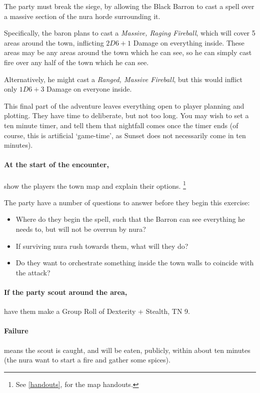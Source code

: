 \begin{multicols}{2}

\noindent
The party must break the siege, by allowing the Black Barron to cast a spell over a massive section of the nura horde surrounding it.

Specifically, the baron plans to cast a \textit{Massive, Raging Fireball}, which will cover 5 areas around the town, inflicting $2D6+1$ Damage on everything inside.
These areas may be any areas around the town which he can see, so he can simply cast fire over any half of the town which he can see.

Alternatively, he might cast a \textit{Ranged, Massive Fireball}, but this would inflict only $1D6 + 3$ Damage on everyone inside.

This final part of the adventure leaves everything open to player planning and plotting.
They have time to deliberate, but not too long.
You may wish to set a ten minute timer, and tell them that nightfall comes once the timer ends (of course, this is artificial `game-time', as Sunset does not necessarily come in ten minutes).

\paragraph{At the start of the encounter,}
show the players the town map and explain their options.%
\footnote{See \autoref{handouts}, for the map handouts.}

The party have a number of questions to answer before they begin this exercise:

\begin{itemize}

  \item{Where do they begin the spell, such that the Barron can see everything he needs to, but will not be overrun by nura?}
  \item{If surviving nura rush towards them, what will they do?}
  \item{Do they want to orchestrate something inside the town walls to coincide with the attack?}

\end{itemize}

\paragraph{If the party scout around the area,}
have them make a Group Roll of Dexterity + Stealth, TN 9.

    \paragraph{Failure}
    means the scout is caught, and will be eaten, publicly, within about ten minutes (the nura want to start a fire and gather some spices).


\end{multicols}
